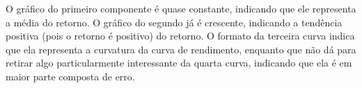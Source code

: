 \documentclass[12pt]{article}
\begin{document}
O gráfico do primeiro componente é quase constante, indicando que ele representa a média do retorno. O gráfico do segundo já é crescente, indicando a tendência positiva (pois o retorno é positivo) do retorno. O formato da terceira curva indica que ela representa a curvatura da curva de rendimento, enquanto que não dá para retirar algo particularmente interessante da quarta curva, indicando que ela é em maior parte composta de erro.
\end{document}
